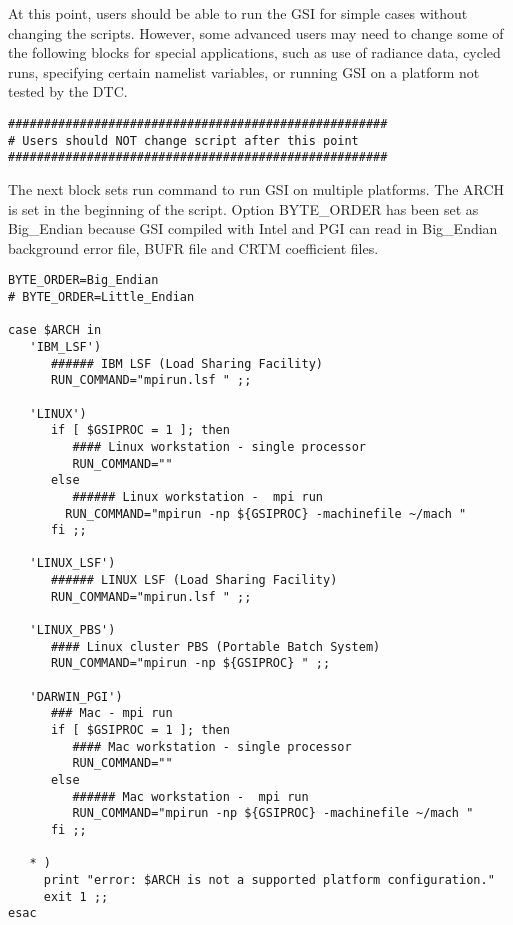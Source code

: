 At this point, users should be able to run the GSI for simple cases without changing the scripts. However, some advanced users may need to change some of the following blocks for special applications, such as use of radiance data, cycled runs, specifying certain namelist variables, or running GSI on a platform not tested by the DTC. 

\begin{footnotesize}
\begin{verbatim}
#####################################################
# Users should NOT change script after this point
#####################################################
\end{verbatim}
\end{footnotesize}

The next block sets run command to run GSI on multiple platforms. The ARCH is set in the beginning of the script. Option BYTE\_ORDER has been set as Big\_Endian because GSI compiled with Intel and PGI can read in Big\_Endian background error file, BUFR file and CRTM coefficient files. 

\begin{footnotesize}
\begin{verbatim}
BYTE_ORDER=Big_Endian
# BYTE_ORDER=Little_Endian

case $ARCH in
   'IBM_LSF')
      ###### IBM LSF (Load Sharing Facility)
      RUN_COMMAND="mpirun.lsf " ;;

   'LINUX')
      if [ $GSIPROC = 1 ]; then
         #### Linux workstation - single processor
         RUN_COMMAND=""
      else
         ###### Linux workstation -  mpi run
        RUN_COMMAND="mpirun -np ${GSIPROC} -machinefile ~/mach "
      fi ;;

   'LINUX_LSF')
      ###### LINUX LSF (Load Sharing Facility)
      RUN_COMMAND="mpirun.lsf " ;;

   'LINUX_PBS')
      #### Linux cluster PBS (Portable Batch System)
      RUN_COMMAND="mpirun -np ${GSIPROC} " ;;

   'DARWIN_PGI')
      ### Mac - mpi run
      if [ $GSIPROC = 1 ]; then
         #### Mac workstation - single processor
         RUN_COMMAND=""
      else
         ###### Mac workstation -  mpi run
         RUN_COMMAND="mpirun -np ${GSIPROC} -machinefile ~/mach "
      fi ;;

   * )
     print "error: $ARCH is not a supported platform configuration."
     exit 1 ;;
esac
\end{verbatim}
\end{footnotesize}

